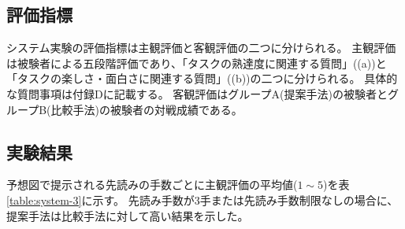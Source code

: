 \subsection{評価指標}
システム実験の評価指標は主観評価と客観評価の二つに分けられる。
主観評価は被験者による五段階評価であり、「タスクの熟達度に関連する質問」((a))と「タスクの楽しさ・面白さに関連する質問」((b))の二つに分けられる。
具体的な質問事項は付録Dに記載する。
客観評価はグループA(提案手法)の被験者とグループB(比較手法)の被験者の対戦成績である。

\subsection{実験結果}
予想図で提示される先読みの手数ごとに主観評価の平均値($1\sim5$)を表\ref{table:system-3}に示す。
先読み手数が3手または先読み手数制限なしの場合に、提案手法は比較手法に対して高い結果を示した。
\begin{table}[H]
    \caption{先読み手数３手の場合}
    \scriptsize
    \centering
    \label{table:system-3}
\end{table}
